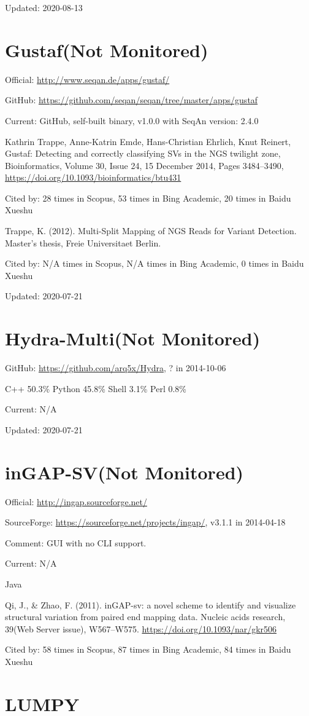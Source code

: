 \documentclass[]{article}
\newcommand{\nm}{{\color{red}(Not Monitored)}}
\newcommand{\cb}[3]{\par Cited by: {\color{blue}\Huge #1} times in Scopus, {\color{blue}\Huge #2} times in Bing Academic, {\color{blue}\Huge #3} times in Baidu Xueshu}
\begin{document}
Updated: 2020-08-13

\section{Gustaf\nm}

Official: \url{http://www.seqan.de/apps/gustaf/}

GitHub: \url{https://github.com/seqan/seqan/tree/master/apps/gustaf}

Current: GitHub, self-built binary, v1.0.0 with SeqAn version: 2.4.0

Kathrin Trappe, Anne-Katrin Emde, Hans-Christian Ehrlich, Knut Reinert, Gustaf: Detecting and correctly classifying SVs in the NGS twilight zone, Bioinformatics, Volume 30, Issue 24, 15 December 2014, Pages 3484–3490, \url{https://doi.org/10.1093/bioinformatics/btu431}\cb{28}{53}{20}

Trappe, K. (2012). Multi-Split Mapping of NGS Reads for Variant Detection. Master’s thesis, Freie Universitaet Berlin.\cb{N/A}{N/A}{0}

Updated: 2020-07-21

\section{Hydra-Multi\nm}

GitHub: \url{https://github.com/arq5x/Hydra}, ? in 2014-10-06

C++ 50.3\% Python 45.8\% Shell 3.1\% Perl 0.8\%

Current: N/A

Updated: 2020-07-21

\section{inGAP-SV\nm}

Official: \url{http://ingap.sourceforge.net/}

SourceForge: \url{https://sourceforge.net/projects/ingap/}, v3.1.1 in 2014-04-18

Comment: GUI with no CLI support.

Current: N/A

Java

Qi, J., \& Zhao, F. (2011). inGAP-sv: a novel scheme to identify and visualize structural variation from paired end mapping data. Nucleic acids research, 39(Web Server issue), W567–W575. \url{https://doi.org/10.1093/nar/gkr506}\cb{58}{87}{84}

\section{LUMPY}
\end{document}
